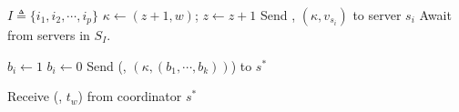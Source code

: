 \begin{algorithm*}[!ht]
\label{app:algrithmB}
  \begin{algorithmic}[2]
  
    \begin{multicols}{0}{\footnotesize
          \EndPart

          \State $I\triangleq \{i_1, i_2, \cdots, i_p \}$
        \Part{ \underline{\writeValue}} {
                \State ${\kappa} \leftarrow (z +1,  w)$; $z \leftarrow z +1 $
            \State Send \writeValueTag, $({\kappa}, v_{s_i})$ to server $s_i$
           \EndFor 
          \State  Await {\ackTag} from servers in  $S_I$.
        }\EndPart
        \Statex
            \Part{ \underline{\informSerializer}} {

             \State $b_i \leftarrow 1$
             \Else
               \State $b_i \leftarrow 0$
            \EndIf
           \EndFor 
                                            \State  Send  (\informSerializerTag, $({\kappa}, (b_{1}, \cdots, b_{k}))$) to   $s^*$

          \State Receive ({\ackTag}, $t_w$) from  coordinator $s^*$
        }\EndPart
      }\end{multicols}
  

\end{algorithmic}
\end{algorithm*}
